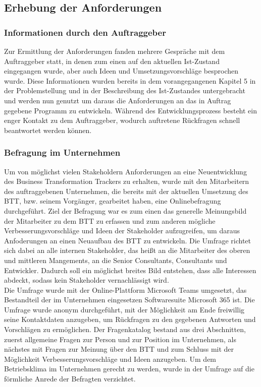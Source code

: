\subsection{Erhebung der Anforderungen}
\subsubsection{Informationen durch den Auftraggeber}
Zur Ermittlung der Anforderungen fanden mehrere Gespräche mit dem Auftraggeber statt, in denen zum einen auf den aktuellen Ist-Zustand eingegangen wurde, aber auch Ideen und Umsetzungsvorschläge besprochen wurde. Diese Informationen wurden bereits in dem vorangegangenen Kapitel 5 in der Problemstellung und in der Beschreibung des Ist-Zustandes untergebracht und werden nun genutzt um daraus die Anforderungen an das in Auftrag gegebene Programm zu entwickeln. Während des Entwicklungsprozess besteht ein enger Kontakt zu dem Auftraggeber, wodurch auftretene Rückfragen schnell beantwortet werden können. 

\subsubsection{Befragung im Unternehmen}
Um von möglichst vielen Stakeholdern Anforderungen an eine Neuentwicklung des Business Transformation Trackers zu erhalten, wurde mit den Mitarbeitern des auftraggebenen Unternehmen, die bereits mit der aktuellen Umsetzung des BTT, bzw. seinem Vorgänger, gearbeitet haben, eine Onlinebefragung durchgeführt. Ziel der Befragung war es zum einen das generelle Meinungsbild der Mitarbeiter zu dem BTT zu erfassen und zum anderen mögliche Verbesserungsvorschläge und Ideen der Stakeholder aufzugreifen, um daraus Anfoderungen an einen Neuaufbau des BTT zu entwickeln. Die Umfrage richtet sich dabei an alle internen Stakeholder, das heißt an die Mitarbeiter des oberen und mittleren Mangements, an die Senior Consultants, Consultants und Entwickler. Dadurch soll ein möglichst breites Bild entstehen, dass alle Interessen abdeckt, sodass kein Stakeholder vernachlässigt wird.\\Die Umfrage wurde mit der Online-Plattform \glqq{}Microsoft Teams\grqq{} umgesetzt, das Bestandteil der im Unternehmen eingesetzen Softwaresuite \glqq{}Microsoft 365\grqq{} ist. Die Umfrage wurde anonym durchgeführt, mit der Möglichkeit am Ende freiwillig seine Kontaktdaten anzugeben, um Rückfragen zu den gegebenen Antworten und Vorschlägen zu ermöglichen. Der Fragenkatalog bestand aus drei Abschnitten, zuerst allgemeine Fragen zur Person und zur Position im Unternehmen, als nächstes mit Fragen zur Meinung über den BTT und zum Schluss mit der Möglichkeit Verbesserungsvorschläge und Ideen anzugeben. Um dem Betriebsklima im Unternehmen gerecht zu werden, wurde in der Umfrage auf die förmliche Anrede der Befragten verzichtet.


